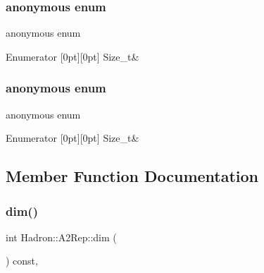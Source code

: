 \subsubsection{\texorpdfstring{anonymous enum}{anonymous enum}}
{\footnotesize\ttfamily anonymous enum}

\begin{DoxyEnumFields}{Enumerator}
[0pt][0pt]{}\mbox{\label{structHadron_1_1A2Rep_a2e8e6c192824f04d5e8059e606aea2afada018654f344243e00f8cdd5f1a4eb53}} 
Size\+\_\+t&\\
\hline

\end{DoxyEnumFields}
\mbox{\label{structHadron_1_1A2Rep_a30832ae08d2074223d6d81e609e4adca}} 
\subsubsection{\texorpdfstring{anonymous enum}{anonymous enum}}
{\footnotesize\ttfamily anonymous enum}

\begin{DoxyEnumFields}{Enumerator}
[0pt][0pt]{}\mbox{\label{structHadron_1_1A2Rep_a2e8e6c192824f04d5e8059e606aea2afada018654f344243e00f8cdd5f1a4eb53}} 
Size\+\_\+t&\\
\hline

\end{DoxyEnumFields}


\subsection{Member Function Documentation}
\mbox{\label{structHadron_1_1A2Rep_a17b15564f35f6be6afa4a189806da16b}} 
\subsubsection{\texorpdfstring{dim()}{dim()}\hspace{0.1cm}{\footnotesize\ttfamily [1/3]}}
{\footnotesize\ttfamily int Hadron\+::\+A2\+Rep\+::dim (\begin{DoxyParamCaption}{ }\end{DoxyParamCaption}) const\hspace{0.3cm}{\ttfamily [inline]}, {\ttfamily [virtual]}}



